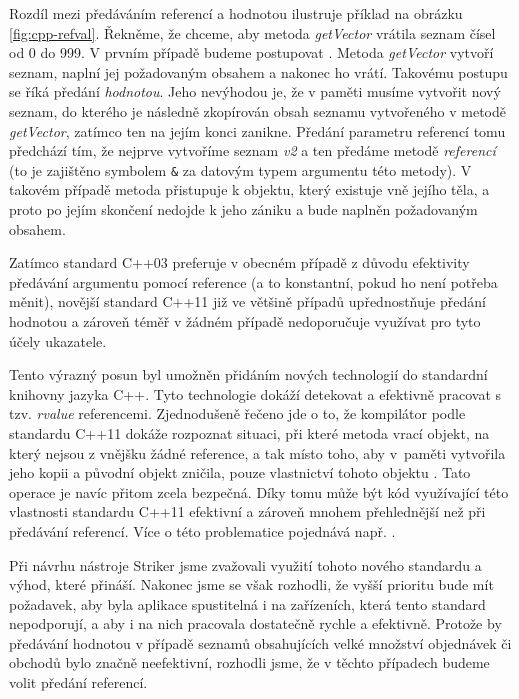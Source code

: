 \documentclass[thesis=M,czech]{FITthesis}[2012/06/26]
\begin{document}
Rozdíl mezi předáváním referencí a hodnotou ilustruje příklad na obrázku \ref{fig:cpp-refval}. Řekněme, že chceme, aby metoda 
\textit{getVector} vrátila seznam čísel od 0 do 999. V prvním případě budeme postupovat . Metoda \textit{getVector} 
vytvoří seznam, naplní jej požadovaným obsahem a nakonec ho vrátí. Takovému postupu se říká předání \textit{hodnotou}. 
Jeho nevýhodou je, že v paměti musíme vytvořit nový seznam, do kterého je následně zkopírován obsah seznamu vytvořeného v metodě
\textit{getVector}, zatímco ten na jejím konci zanikne. Předání parametru referencí tomu předchází tím, že nejprve vytvoříme 
seznam \textit{v2} a ten předáme metodě \textit{referencí} (to je zajištěno symbolem \texttt{\&} za datovým typem argumentu této 
metody). V takovém případě metoda přistupuje k objektu, který existuje vně jejího těla, a proto po jejím skončení nedojde k jeho 
zániku a bude naplněn požadovaným obsahem.

Zatímco standard C++03 preferuje v obecném případě z důvodu efektivity předávání argumentu pomocí reference (a to konstantní, pokud ho není potřeba 
měnit), novější standard C++11 již ve většině případů upřednostňuje předání hodnotou a zároveň téměř v žádném případě nedoporučuje 
využívat pro tyto účely ukazatele.

Tento výrazný posun byl umožněn přidáním nových technologií do standardní knihovny jazyka C++. Tyto technologie dokáží detekovat a 
efektivně pracovat s tzv. \textit{rvalue} referencemi.
Zjednodušeně řečeno jde o to, že kompilátor podle standardu C++11 dokáže rozpoznat situaci, při které metoda vrací objekt, 
na který nejsou z vnějšku žádné reference, a tak místo toho, aby v~paměti vytvořila jeho kopii a původní objekt zničila, pouze 
vlastnictví tohoto objektu . Tato operace je navíc přitom zcela bezpečná. Díky tomu může být kód využívající této 
vlastnosti standardu C++11 efektivní a zároveň mnohem přehlednější než při předávání referencí. Více o této problematice 
pojednává např. \cite{rvalue}.

Při návrhu nástroje Striker jsme zvažovali využití tohoto nového standardu a výhod, které přináší. Nakonec jsme se však rozhodli, že 
vyšší prioritu bude mít požadavek, aby byla aplikace spustitelná i na zařízeních, která tento standard nepodporují, a aby i na nich 
pracovala dostatečně rychle a efektivně. Protože by předávání hodnotou v případě seznamů obsahujících velké množství objednávek 
či obchodů bylo značně neefektivní, rozhodli jsme, že v těchto případech budeme volit předání referencí.
\end{document}
